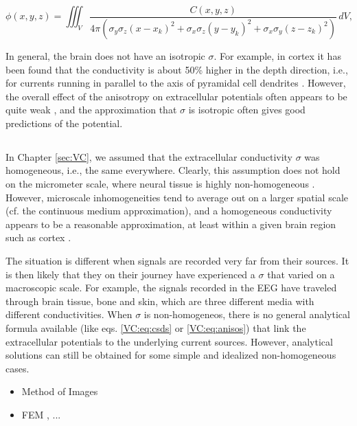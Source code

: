 \begin{equation}
\phi(x,y,z) = \iiint_V \frac{C(x,y,z)}{4\pi(\sigma_y\sigma_z (x-x_k)^2 + \sigma_x\sigma_z (y-y_k)^2 + \sigma_x\sigma_y (z-z_k)^2)} \, dV, 
\label{Sigma:eq:Canisos}
\end{equation}

In general, the brain does not have an isotropic $\sigma$. For example, in cortex it has been found that the conductivity is about 50\% higher in the depth direction, i.e., for currents running in parallel to the axis of pyramidal cell dendrites \citep{Goto2010}. However, the overall effect of the anisotropy on extracellular potentials often appears to be quite weak \citep{Ness2015}, and the approximation that $\sigma$ is isotropic often gives good predictions of the potential.


\subsection{}
\label{sec:Sigma:nonhomo}

In Chapter \ref{sec:VC}, we assumed that the extracellular conductivity $\sigma$ was homogeneous, i.e., the same everywhere. Clearly, this assumption does not hold on the micrometer scale, where neural tissue is highly non-homogeneous \citep{Nicholson1998}. However, microscale inhomogeneities tend to average out on a larger spatial scale (cf. the continuous medium approximation), and a homogeneous conductivity appears to be a reasonable approximation, at least within a given brain region such as cortex \citep{Logothetis2007}. 

The situation is different when signals are recorded very far from their sources. It is then likely that they on their journey have experienced a $\sigma$ that varied on a macroscopic scale. For example, the signals recorded in the EEG have traveled through brain tissue, bone and skin, which are three different media with different conductivities. When $\sigma$ is non-homogeneos, there is no general analytical formula available (like eqs. \ref{VC:eq:csds} or \ref{VC:eq:anisos}) that link the extracellular potentials to the underlying current sources. However, analytical solutions can still be obtained for some simple and idealized non-homogeneous cases. 

\begin{itemize}
\item Method of Images \citep{Ness2015}
\item FEM \citep{Ness2015}, ...
\end{itemize}

